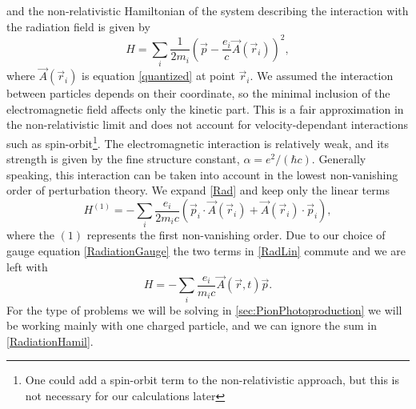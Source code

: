 and the non-relativistic Hamiltonian of the system describing the interaction with the radiation field is given by
\begin{equation} \label{Rad}
	H = \sum_i \frac{1}{2m_i}\left( \vec{p}-\frac{e_i}{c}\vec{A}(\vec{r}_i)\right)^2,
\end{equation}
where $\vec{A}(\vec{r}_i)$ is equation \eqref{quantized} at point $\vec{r}_i$. We assumed the interaction between particles depends on their coordinate, so the minimal inclusion of the electromagnetic field affects only the kinetic part. This is a fair approximation in the non-relativistic limit and does not account for velocity-dependant interactions such as spin-orbit\footnote{One could add a spin-orbit term to the non-relativistic approach, but this is not necessary for our calculations later}. 
The electromagnetic interaction is relatively weak, and its strength is given by the fine structure constant, $\alpha = e^2/(\hbar c)$. Generally speaking, this interaction can be taken into account in the lowest non-vanishing order of perturbation theory. We expand \eqref{Rad} and keep only the linear terms
\begin{equation} \label{RadLin}
	H^{(1)} = -\sum_i \frac{e_i}{2m_i c} (\vec{p}_i\cdot \vec{A}(\vec{r}_i)+\vec{A}(\vec{r}_i)\cdot \vec{p}_i),
\end{equation}
where the $(1)$ represents the first non-vanishing order. Due to our choice of gauge equation \eqref{RadiationGauge} the two terms in \eqref{RadLin} commute and we are left with
\begin{equation} \label{RadiationHamil}
	H = - \sum_i \frac{e_i}{m_i c} \vec{A}(\vec{r},t)\vec{p}.
\end{equation}
For the type of problems we will be solving in \ref{sec:PionPhotoproduction} we will be working mainly with one charged particle, and we can ignore the sum in \eqref{RadiationHamil}.
